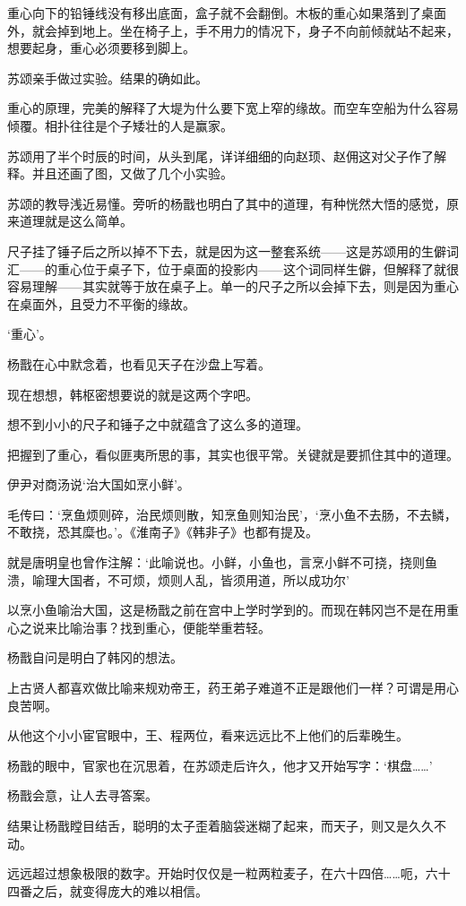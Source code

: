 重心向下的铅锤线没有移出底面，盒子就不会翻倒。木板的重心如果落到了桌面外，就会掉到地上。坐在椅子上，手不用力的情况下，身子不向前倾就站不起来，想要起身，重心必须要移到脚上。

苏颂亲手做过实验。结果的确如此。

重心的原理，完美的解释了大堤为什么要下宽上窄的缘故。而空车空船为什么容易倾覆。相扑往往是个子矮壮的人是赢家。

苏颂用了半个时辰的时间，从头到尾，详详细细的向赵顼、赵佣这对父子作了解释。并且还画了图，又做了几个小实验。

苏颂的教导浅近易懂。旁听的杨戬也明白了其中的道理，有种恍然大悟的感觉，原来道理就是这么简单。

尺子挂了锤子后之所以掉不下去，就是因为这一整套系统——这是苏颂用的生僻词汇——的重心位于桌子下，位于桌面的投影内——这个词同样生僻，但解释了就很容易理解——其实就等于放在桌子上。单一的尺子之所以会掉下去，则是因为重心在桌面外，且受力不平衡的缘故。

‘重心’。

杨戬在心中默念着，也看见天子在沙盘上写着。

现在想想，韩枢密想要说的就是这两个字吧。

想不到小小的尺子和锤子之中就蕴含了这么多的道理。

把握到了重心，看似匪夷所思的事，其实也很平常。关键就是要抓住其中的道理。

伊尹对商汤说‘治大国如烹小鲜’。

毛传曰：‘烹鱼烦则碎，治民烦则散，知烹鱼则知治民’，‘烹小鱼不去肠，不去鳞，不敢挠，恐其糜也。’。《淮南子》《韩非子》也都有提及。

就是唐明皇也曾作注解：‘此喻说也。小鲜，小鱼也，言烹小鲜不可挠，挠则鱼溃，喻理大国者，不可烦，烦则人乱，皆须用道，所以成功尔’

以烹小鱼喻治大国，这是杨戬之前在宫中上学时学到的。而现在韩冈岂不是在用重心之说来比喻治事？找到重心，便能举重若轻。

杨戬自问是明白了韩冈的想法。

上古贤人都喜欢做比喻来规劝帝王，药王弟子难道不正是跟他们一样？可谓是用心良苦啊。

从他这个小小宦官眼中，王、程两位，看来远远比不上他们的后辈晚生。

杨戬的眼中，官家也在沉思着，在苏颂走后许久，他才又开始写字：‘棋盘……’

杨戬会意，让人去寻答案。

结果让杨戬瞠目结舌，聪明的太子歪着脑袋迷糊了起来，而天子，则又是久久不动。

远远超过想象极限的数字。开始时仅仅是一粒两粒麦子，在六十四倍……呃，六十四番之后，就变得庞大的难以相信。

